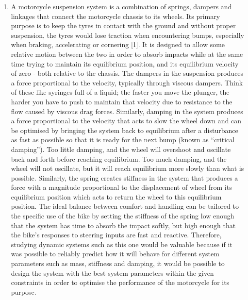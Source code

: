 \documentclass[12pt]{article}
\begin{document}
    \begin{enumerate}
        \item A motorcycle suspension system is a combination of springs, dampers and linkages that connect the motorcycle chassis to its wheels.
        Its primary purpose is to keep the tyres in contact with the ground and without proper suspension, the tyres would lose traction when encountering bumps, especially when braking, accelerating or cornering [1].
        It is designed to allow some relative motion between the two in order to absorb impacts while at the same time trying to maintain its equilibrium position, and its equilibrium velocity of zero - both relative to the chassis.
        The dampers in the suspension produces a force proportional to the velocity, typically through viscous dampers.
        Think of these like syringes full of a liquid; the faster you move the plunger, the harder you have to push to maintain that velocity due to resistance to the flow caused by viscous drag forces.
        Similarly, damping in the system produces a force proportional to the velocity that acts to slow the wheel down and can be optimised by bringing the system back to equilibrium after a disturbance as fast as possible so that it is ready for the next bump (known as ``critical damping'').
        Too little damping, and the wheel will overshoot and oscillate back and forth before reaching equilibrium.
        Too much damping, and the wheel will not oscillate, but it will reach equilibrium more slowly than what is possible.
        Similarly, the spring creates stiffness in the system that produces a force with a magnitude proportional to the displacement of wheel from its equilibrium position which acts to return the wheel to this equilibrium position.
        The ideal balance between comfort and handling can be tailored to the specific use of the bike by setting the stiffness of the spring low enough that the system has time to absorb the impact softly, but high enough that the bike's responses to steering inputs are fast and reactive.
        Therefore, studying dynamic systems such as this one would be valuable because if it was possible to reliably predict how it will behave for different system parameters such as mass, stiffness and damping, it would be possible to design the system with the best system parameters within the given constraints in order to optimise the performance of the motorcycle for its purpose.


\end{enumerate}
\end{document}
